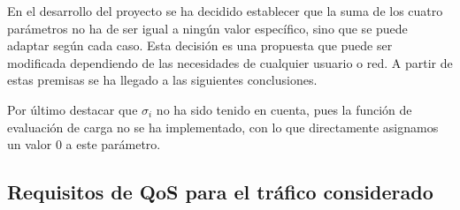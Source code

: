 \documentclass[a4paper,11pt]{book}
\begin{document}
En el desarrollo del proyecto se ha decidido establecer que la suma de los cuatro parámetros no ha de ser igual a ningún valor específico, sino que se puede adaptar según cada caso. Esta decisión es una propuesta que puede ser modificada dependiendo de las necesidades de cualquier usuario o red. A partir de estas premisas se ha llegado a las siguientes conclusiones.

Por último destacar que $\sigma_i$ no ha sido tenido en cuenta, pues la función de evaluación de carga no se ha implementado, con lo que directamente asignamos un valor 0 a este parámetro.

\subsection{Requisitos de \ac{QoS} para el tráfico considerado}\label{calidad}
\end{document}
